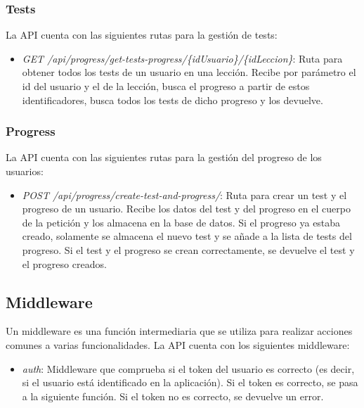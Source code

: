 \subsubsection{Tests}
\label{sec:tests}
La API cuenta con las siguientes rutas para la gestión de tests:

\begin{itemize}
  \item \textit{GET /api/progress/get-tests-progress/\{idUsuario\}/\{idLeccion\}}: Ruta para obtener todos los tests de un usuario en una lección. Recibe por parámetro el id del usuario y el de la lección, busca el progreso a partir de estos identificadores, busca todos los tests de dicho progreso y los devuelve.
\end{itemize}


\subsubsection{Progress}
\label{sec:progress}
La API cuenta con las siguientes rutas para la gestión del progreso de los usuarios:

\begin{itemize}
  \item \textit{POST /api/progress/create-test-and-progress/}: Ruta para crear un test y el progreso de un usuario. Recibe los datos del test y del progreso en el cuerpo de la petición y los almacena en la base de datos. Si el progreso ya estaba creado, solamente se almacena el nuevo test y se añade a la lista de tests del progreso. Si el test y el progreso se crean correctamente, se devuelve el test y el progreso creados. 
\end{itemize}




\subsection{Middleware}
\label{sec:middleware}
Un middleware es una función intermediaria que se utiliza para realizar acciones comunes a varias funcionalidades. La API cuenta con los siguientes middleware:

\begin{itemize}
  \item \textit{auth}: Middleware que comprueba si el token del usuario es correcto (es decir, si el usuario está identificado en la aplicación). Si el token es correcto, se pasa a la siguiente función. Si el token no es correcto, se devuelve un error.
\end {itemize}

